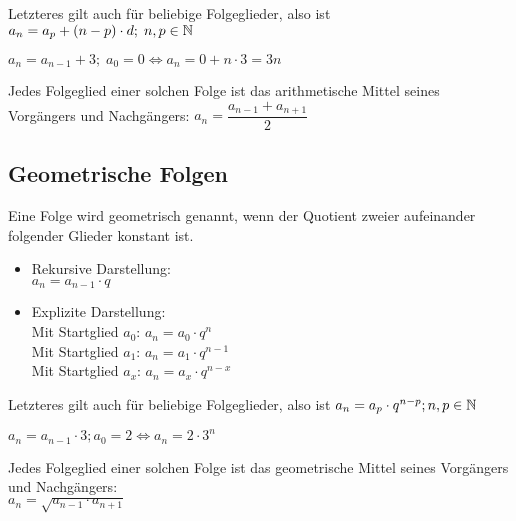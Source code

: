 \documentclass[main.tex]{subfiles}
\begin{document}
\begin{Bemerkung}
Letzteres gilt auch für beliebige Folgeglieder, also ist $a_{n}=a_{p}+(n-p)\cdot d;\;n,p\in\mathbb{N}$
\end{Bemerkung}

\begin{Beispiel}
$a_{n}=a_{n-1}+3;\;a_{0}=0\Leftrightarrow a_{n}=0+n\cdot3=3n$
\end{Beispiel}

\begin{Bemerkung}
Jedes Folgeglied einer solchen Folge ist das arithmetische Mittel seines Vorgängers und Nachgängers: $a_{n}=\dfrac{a_{n-1}+a_{n+1}}{2}$
\end{Bemerkung}

	\subsection{Geometrische Folgen}

\begin{Definition}
Eine Folge wird geometrisch genannt, wenn der Quotient zweier aufeinander folgender Glieder konstant ist.
\begin{itemize}
\item Rekursive Darstellung:\\
\indent $a_{n}=a_{n-1}\cdot q$
\item Explizite Darstellung:\\
\indent Mit Startglied $a_{0}$: $a_{n}=a_{0}\cdot q^n$\\
\indent Mit Startglied $a_{1}$: $a_{n}=a_{1}\cdot q^{n-1}$\\
\indent Mit Startglied $a_{x}$: $a_{n}=a_{x}\cdot q^{n-x}$\\
\end{itemize}
\end{Definition}

\begin{Bemerkung}
Letzteres gilt auch für beliebige Folgeglieder, also ist $a_{n}=a_{p}\cdot q^{n-p};n,p\in\mathbb{N}$
\end{Bemerkung}

\begin{Beispiel}
$a_{n}=a_{n-1}\cdot3;a_{0}=2\Leftrightarrow a_{n}=2\cdot3^n$
\end{Beispiel}

\begin{Bemerkung}
Jedes Folgeglied einer solchen Folge ist das geometrische Mittel seines Vorgängers und Nachgängers:\\
 $a_{n}=\sqrt{a_{n-1}\cdot a_{n+1}}$
\end{Bemerkung}
\end{document}
